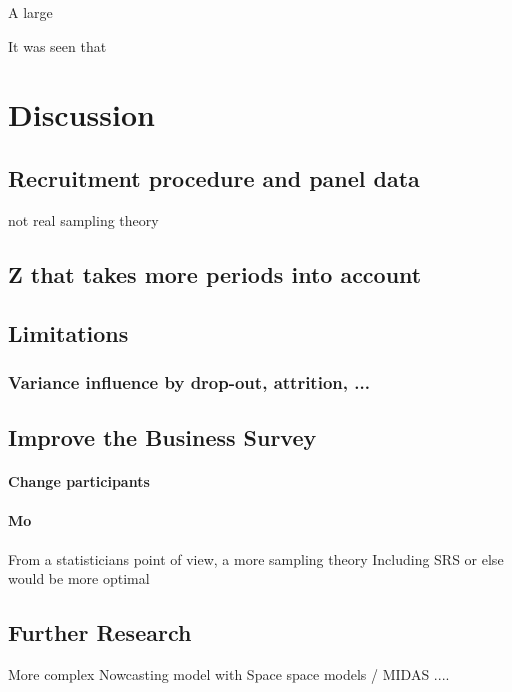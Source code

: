 \documentclass[12pt,a4paper,oneside]{book}
\begin{document}
A large 

It was seen that


\chapter{Discussion}

\section{Recruitment procedure and panel data}
not real sampling theory



\section{Z that takes more periods into account}



\section{Limitations}

\subsection*{Variance influence by drop-out, attrition, ...}

\section{Improve the Business Survey}

\subsubsection*{Change participants}

\subsubsection*{Mo}
From a statisticians point of view, a more sampling theory Including SRS or else would be more optimal

\section{Further Research}



More complex Nowcasting model with Space space models / MIDAS ....
\end{document}

